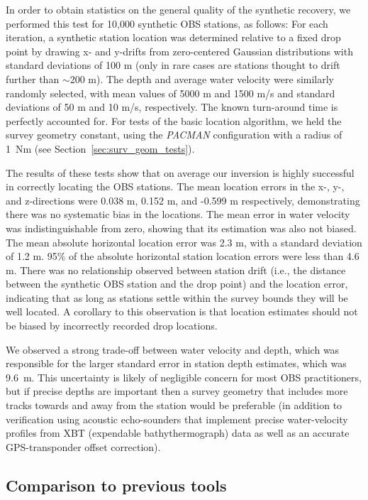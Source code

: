 In order to obtain statistics on the general quality of the synthetic recovery, we performed this test for 10,000 synthetic OBS stations, as follows: For each iteration, a synthetic station location was determined relative to a fixed drop point by drawing x- and y-drifts from zero-centered Gaussian distributions with standard deviations of 100 m (only in rare cases are stations thought to drift further than $\sim$200 m). The depth and average water velocity were similarly randomly selected, with mean values of 5000 m and 1500 m/s and standard deviations of 50 m and 10 m/s, respectively. The known turn-around time is perfectly accounted for. For tests of the basic location algorithm, we held the survey geometry constant, using the \textit{PACMAN} configuration with a radius of 1~Nm (see Section~\ref{sec:surv_geom_tests}). 
  
The results of these tests show that on average our inversion is highly successful in correctly locating the OBS stations. The mean location errors in the x-, y-, and z-directions were 0.038 m, 0.152 m, and -0.599 m respectively, demonstrating there was no systematic bias in the locations. The mean error in water velocity was indistinguishable from zero, showing that its estimation was also not biased. The mean absolute horizontal location error was 2.3 m, with a standard deviation of 1.2 m. 95\% of the absolute horizontal station location errors were less than 4.6 m. There was no relationship observed between station drift (i.e., the distance between the synthetic OBS station and the drop point) and the location error, indicating that as long as stations settle within the survey bounds they will be well located. A corollary to this observation is that location estimates should not be biased by incorrectly recorded drop locations. 

We observed a strong trade-off between water velocity and depth, which was responsible for the larger standard error in station depth estimates, which was \mbox{9.6~m}. This uncertainty is likely of negligible concern for most OBS practitioners, but if precise depths are important then a survey geometry that includes more tracks towards and away from the station would be preferable (in addition to verification using acoustic echo-sounders that implement precise water-velocity profiles from XBT (expendable bathythermograph) data as well as an accurate GPS-transponder offset correction).

\subsection{Comparison to previous tools} \label{sec:Comparison_to_previous_tools}

